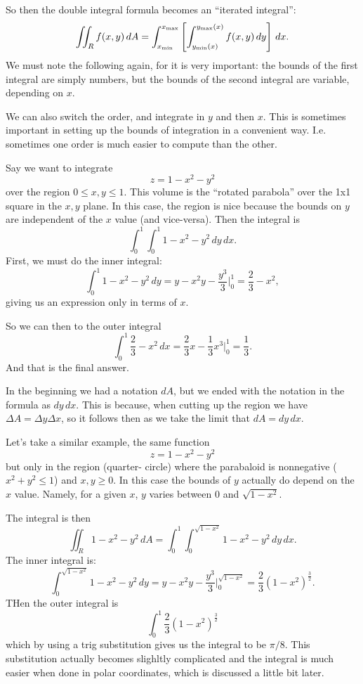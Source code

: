 So then the double integral formula becomes an ``iterated integral'':
\[ \iint_R f(x,y)\,dA = \int_{x_{\mathrm{min}}}^{x_{\mathrm{max}}} \left[\int_{y_{\mathrm{min}}(x)}^{y_{\mathrm{max}}(x)} f(x,y)\, dy \right]\,dx. \]
We must note the following again, for it is very important: the bounds of the first integral are simply numbers, but the bounds of the second integral are variable, depending on $x$.

\brm
We can also switch the order, and integrate in $y$ and then $x$. This is sometimes important in setting up the bounds of integration in a convenient way. I.e. sometimes one order is much easier to compute than the other.
\erm

\bex
Say we want to integrate
\[ z = 1-x^2-y^2 \]
over the region $0 \le x,y \le 1$. This volume is the ``rotated parabola'' over the 1x1 square in the $x,y$ plane. In this case, the region is nice because the bounds on $y$ are independent of the $x$ value (and vice-versa). Then the integral is
\[ \int_0^1 \int_0^1 1 - x^2 - y^2 \,dy\,dx. \]
First, we must do the inner integral:
\[ \int_0^1 1-x^2-y^2 \,dy = y - x^2y - \frac{y^3}3 \bigg|_0^1 = \frac23 - x^2, \]
giving us an expression only in terms of $x$. 

So we can then to the outer integral
\[ \int_0^1 \frac23-x^2\,dx = \frac23x - \frac13x^3 \bigg|_0^1 =\frac13. \]
And that is the final answer.
\eex

\brm
In the beginning we had a notation $dA$, but we ended with the notation in the formula as $dy\,dx$. This is because, when cutting up the region we have $\Delta A = \Delta y \Delta x$, so it follows then as we take the limit that $dA = dy\,dx.$
\erm

\bex
Let's take a similar example, the same function
\[ z = 1-x^2-y^2 \]
but only in the region (quarter- circle) where the parabaloid is nonnegative ($x^2+y^2\le1$) and $x,y\ge0$. In this case the bounds of $y$ actually do depend on the $x$ value. Namely, for a given $x$, $y$ varies between 0 and $\sqrt{1-x^2}$.

The integral is then
\[ \iint_R 1 - x^2-y^2 \,dA = \int_0^1 \int_0^{\sqrt{1-x^2}} 1-x^2-y^2\,dy\,dx. \]
The inner integral is:
\[ \int_0^{\sqrt{1-x^2}} 1-x^2-y^2\,dy = y - x^2y - \frac{y^3}3 \bigg|_0^{\sqrt{1-x^2}} = \frac23(1-x^2)^{\frac32}. \]
THen the outer integral is
\[ \int_0^1 \frac23(1-x^2)^{\frac32} \]
which by using a trig substitution gives us the integral to be $\pi/8$. This substitution actually becomes slighltly complicated and the integral is much easier when done in polar coordinates, which is discussed a little bit later. 
\eex

